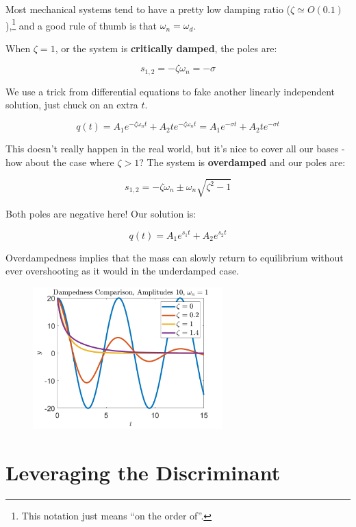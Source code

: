 \documentclass[
  letterpaper,
  DIV=11,
  numbers=noendperiod]{scrreprt}
\begin{document}
Most mechanical systems tend to have a pretty low damping ratio
(\(\zeta \simeq O(0.1)\)),\footnote{This notation just means ``on the
  order of''.} and a good rule of thumb is that \(\omega_n = \omega_d\).

When \(\zeta = 1\), or the system is \textbf{critically damped}, the
poles are:

\[s_{1, 2} = -\zeta \omega_n = - \sigma\]

We use a trick from differential equations to fake another linearly
independent solution, just chuck on an extra \(t\).

\[q(t) = A_1 e^{-\zeta \omega_n t} + A_2 t e^{-\zeta \omega_n t} = A_1 e^{-\sigma t} + A_2 t e^{-\sigma t}\]

This doesn't really happen in the real world, but it's nice to cover all
our bases - how about the case where \(\zeta > 1\)? The system is
\textbf{overdamped} and our poles are:

\[s_{1, 2} = -\zeta \omega_n \pm \omega_n \sqrt{\zeta^2 - 1}\]

Both poles are negative here! Our solution is:

\[q(t) = A_1 e^{s_1 t} + A_2 e^{s_2 t}\]

Overdampedness implies that the mass can slowly return to equilibrium
without ever overshooting as it would in the underdamped case.

\begin{figure}

{\centering \includegraphics[width=0.65\textwidth,height=\textheight]{figs/3_damp.png}

}

\end{figure}

\hypertarget{leveraging-the-discriminant}{%
\section{Leveraging the
Discriminant}\label{leveraging-the-discriminant}}
\end{document}
